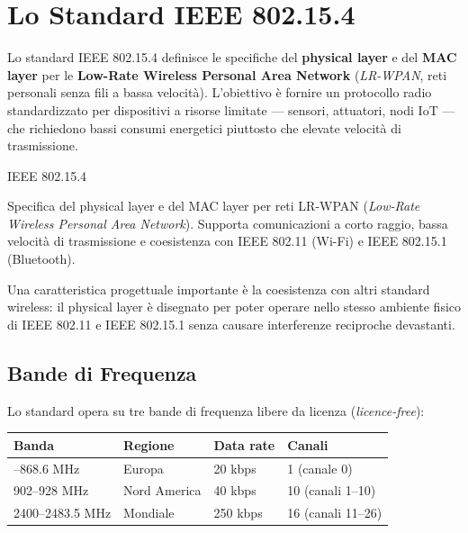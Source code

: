 \documentclass[
  italian,
  openany]{book}
\newcounter{none} %
\begin{document}
\newpage

\chapter{Lo Standard IEEE 802.15.4}\label{lo-standard-ieee-802.15.4}

Lo standard IEEE 802.15.4 definisce le specifiche del \textbf{physical
layer} e del \textbf{MAC layer} per le \textbf{Low-Rate Wireless
Personal Area Network} (\emph{LR-WPAN}, reti personali senza fili a
bassa velocità). L'obiettivo è fornire un protocollo radio
standardizzato per dispositivi a risorse limitate --- sensori,
attuatori, nodi IoT --- che richiedono bassi consumi energetici
piuttosto che elevate velocità di trasmissione.

\begin{calloutdefinition}{IEEE 802.15.4}

Specifica del physical layer e del MAC layer per reti LR-WPAN
(\emph{Low-Rate Wireless Personal Area Network}). Supporta comunicazioni
a corto raggio, bassa velocità di trasmissione e coesistenza con IEEE
802.11 (Wi-Fi) e IEEE 802.15.1 (Bluetooth).

\end{calloutdefinition}

Una caratteristica progettuale importante è la coesistenza con altri
standard wireless: il physical layer è disegnato per poter operare nello
stesso ambiente fisico di IEEE 802.11 e IEEE 802.15.1 senza causare
interferenze reciproche devastanti.

\section{Bande di Frequenza}\label{bande-di-frequenza}

Lo standard opera su tre bande di frequenza libere da licenza
(\emph{licence-free}):

{\def\LTcaptype{none} %
\begin{longtable}[]{@{}llll@{}}
\toprule\noalign{}
Banda & Regione & Data rate & Canali \\
\midrule\noalign{}
\endhead
\bottomrule\noalign{}
\endlastfoot
868--868.6 MHz & Europa & 20 kbps & 1 (canale 0) \\
902--928 MHz & Nord America & 40 kbps & 10 (canali 1--10) \\
2400--2483.5 MHz & Mondiale & 250 kbps & 16 (canali 11--26) \\
\end{longtable}
}
\end{document}

